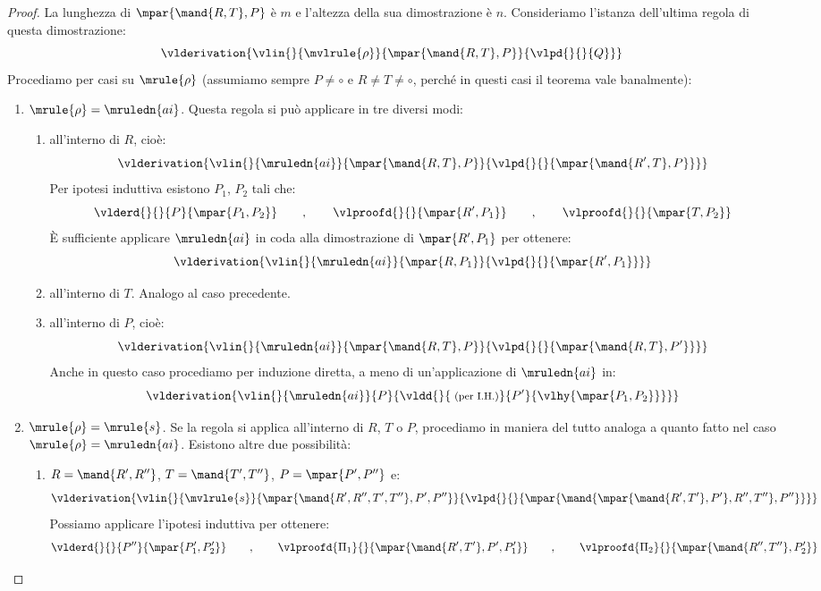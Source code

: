 \documentclass[12pt,a4paper,openright,twoside]{report}
\begin{document}
\begin{proof}
La lunghezza di $\mpar{\mand{R,T},P}$ \`e $m$ e l'altezza della sua dimostrazione \`e $n$. Consideriamo l'istanza dell'ultima regola di questa dimostrazione:
$$
	\vlderivation{
		\vlin{}{\mvlrule{\rho}}{\mpar{\mand{R,T},P}}{
			\vlpd{}{}{Q}
		}
	}
$$
Procediamo per casi su $\mrule{\rho}$ (assumiamo sempre $P \not= \circ$ e $R \not= T \not= \circ$, perch\'e in questi casi il teorema vale banalmente):
\begin{enumerate}
	\item $\mrule{\rho} = \mruledn{ai}$. Questa regola si pu\`o applicare in tre diversi modi:
	\begin{enumerate}[label=\arabic{enumi}.\arabic*.]
		\item all'interno di $R$, cio\`e:
		$$
			\vlderivation{
				\vlin{}{\mruledn{ai}}{\mpar{\mand{R,T},P}}{
					\vlpd{}{}{\mpar{\mand{R',T},P}}
				}
			}
		$$
		Per ipotesi induttiva esistono $P_1$, $P_2$ tali che:
		$$
			\vlderd{}{}{P}{\mpar{P_1, P_2}} \qquad,\qquad \vlproofd{}{}{\mpar{R',P_1}} \qquad,\qquad \vlproofd{}{}{\mpar{T,P_2}}
		$$
		\`E sufficiente applicare $\mruledn{ai}$ in coda alla dimostrazione di $\mpar{R',P_1}$ per ottenere:
		$$
			\vlderivation{
				\vlin{}{\mruledn{ai}}{\mpar{R,P_1}}{
					\vlpd{}{}{\mpar{R',P_1}}
				}
			}
		$$
		\item all'interno di $T$. Analogo al caso precedente.
		\item all'interno di $P$, cio\`e:
		$$
			\vlderivation{
				\vlin{}{\mruledn{ai}}{\mpar{\mand{R,T},P}}{
					\vlpd{}{}{\mpar{\mand{R,T},P'}}
				}
			}
		$$
		Anche in questo caso procediamo per induzione diretta, a meno di un'applicazione di $\mruledn{ai}$ in:
		$$
			\vlderivation{
				\vlin{}{\mruledn{ai}}{P}{
					\vldd{}{\;\mbox{\footnotesize{(per I.H.)}}}{P'}{\vlhy{\mpar{P_1,P_2}}}
				}
			}
		$$
	\end{enumerate}
	\item $\mrule{\rho} = \mrule{s}$. Se la regola si applica all'interno di $R$, $T$ o $P$, procediamo in maniera del tutto analoga a quanto fatto nel caso $\mrule{\rho} = \mruledn{ai}$. Esistono altre due possibilit\`a:
	\begin{enumerate}[label=\arabic{enumi}.\arabic*.]
		\item $R=\mand{R',R''}$, $T=\mand{T',T''}$, $P=\mpar{P',P''}$ e:
		$$
			\vlderivation{
				\vlin{}{\mvlrule{s}}{\mpar{\mand{R',R'',T',T''}, P', P''}}{
					\vlpd{}{}{\mpar{\mand{\mpar{\mand{R', T'}, P'}, R'', T''}, P''}}
				}
			}
		$$
		Possiamo applicare l'ipotesi induttiva per ottenere:
		$$
			\vlderd{}{}{P''}{\mpar{P_1', P_2'}} \qquad,\qquad \vlproofd{\Pi_1}{}{\mpar{\mand{R',T'}, P', P_1'}} \qquad,\qquad \vlproofd{\Pi_2}{}{\mpar{\mand{R'', T''}, P_2'}}
$$
\end{enumerate}
\end{enumerate}
\end{proof}
\end{document}
